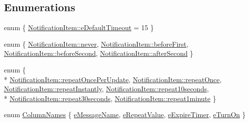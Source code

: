 \subsection*{Enumerations}
\begin{DoxyCompactItemize}
\item 
enum \{ \hyperlink{group__notifyplugin_ggaa52522623ea593ea4ed734f3e904d7d4a8fee5829d0108684543cf01a53af668f}{Notification\-Item\-::e\-Default\-Timeout} = 15
 \}
\item 
enum \{ \hyperlink{group__notifyplugin_gga06504fecf1d1894e31d55d101309a379a908fb8bab8f2e2e5aae18d53fe643c1e}{Notification\-Item\-::never}, 
\hyperlink{group__notifyplugin_gga06504fecf1d1894e31d55d101309a379af3a07edb74d1ab9b39fd6db3b1d6ad00}{Notification\-Item\-::before\-First}, 
\hyperlink{group__notifyplugin_gga06504fecf1d1894e31d55d101309a379ac0e140c5209cc791f99fc19ddf8fe6f0}{Notification\-Item\-::before\-Second}, 
\hyperlink{group__notifyplugin_gga06504fecf1d1894e31d55d101309a379a95117a3c7ab2e169b43a3121a329a43a}{Notification\-Item\-::after\-Second}
 \}
\item 
enum \{ \\*
\hyperlink{group__notifyplugin_gga506482c4a81f715a735c84b55f36a72ca1a55bc3c686d15eb1e9d010b7a07a50a}{Notification\-Item\-::repeat\-Once\-Per\-Update}, 
\hyperlink{group__notifyplugin_gga506482c4a81f715a735c84b55f36a72ca13280fe30c3bd30abf86825b504b6ec7}{Notification\-Item\-::repeat\-Once}, 
\hyperlink{group__notifyplugin_gga506482c4a81f715a735c84b55f36a72ca49596c4af726c4fb52dbfe7df33c7178}{Notification\-Item\-::repeat\-Instantly}, 
\hyperlink{group__notifyplugin_gga506482c4a81f715a735c84b55f36a72cac3e73d8efe76007eeca66f2cfb609075}{Notification\-Item\-::repeat10seconds}, 
\\*
\hyperlink{group__notifyplugin_gga506482c4a81f715a735c84b55f36a72ca18a34ac252d2f02c618ee1a4aae6ce9e}{Notification\-Item\-::repeat30seconds}, 
\hyperlink{group__notifyplugin_gga506482c4a81f715a735c84b55f36a72ca014d745bf7f8943763a58f8c55d5891b}{Notification\-Item\-::repeat1minute}
 \}
\item 
enum \hyperlink{group__notifyplugin_ga3ec6ea811170d841b03620c04d226813}{Column\-Names} \{ \hyperlink{group__notifyplugin_gga3ec6ea811170d841b03620c04d226813a6533c8abcee8e94f7b002f99b98e2834}{e\-Message\-Name}, 
\hyperlink{group__notifyplugin_gga3ec6ea811170d841b03620c04d226813ad13b8ea4b42b6b77f0e39ed8bf96fac9}{e\-Repeat\-Value}, 
\hyperlink{group__notifyplugin_gga3ec6ea811170d841b03620c04d226813a408c57145709557bbbfd4aa4b748f346}{e\-Expire\-Timer}, 
\hyperlink{group__notifyplugin_gga3ec6ea811170d841b03620c04d226813a4fbe00e076370c4dab6c8c5d51bec551}{e\-Turn\-On}
 \}
\end{DoxyCompactItemize}
